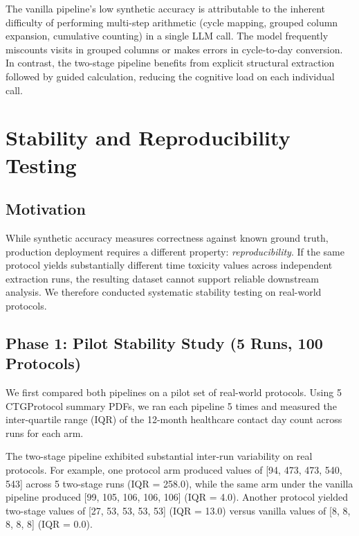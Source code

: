 \documentclass[11pt]{article}
\begin{document}
The vanilla pipeline's low synthetic accuracy is attributable to the inherent difficulty of performing multi-step arithmetic (cycle mapping, grouped column expansion, cumulative counting) in a single LLM call. The model frequently miscounts visits in grouped columns or makes errors in cycle-to-day conversion. In contrast, the two-stage pipeline benefits from explicit structural extraction followed by guided calculation, reducing the cognitive load on each individual call.

\section{Stability and Reproducibility Testing}
\label{sec:stability}

\subsection{Motivation}

While synthetic accuracy measures correctness against known ground truth, production deployment requires a different property: \emph{reproducibility}. If the same protocol yields substantially different time toxicity values across independent extraction runs, the resulting dataset cannot support reliable downstream analysis. We therefore conducted systematic stability testing on real-world protocols.

\subsection{Phase 1: Pilot Stability Study (5 Runs, 100 Protocols)}

We first compared both pipelines on a pilot set of real-world protocols. Using 5 CTGProtocol summary PDFs, we ran each pipeline 5 times and measured the inter-quartile range (IQR) of the 12-month healthcare contact day count across runs for each arm.

The two-stage pipeline exhibited substantial inter-run variability on real protocols. For example, one protocol arm produced values of [94, 473, 473, 540, 543] across 5 two-stage runs (IQR = 258.0), while the same arm under the vanilla pipeline produced [99, 105, 106, 106, 106] (IQR = 4.0). Another protocol yielded two-stage values of [27, 53, 53, 53, 53] (IQR = 13.0) versus vanilla values of [8, 8, 8, 8, 8] (IQR = 0.0).
\end{document}
